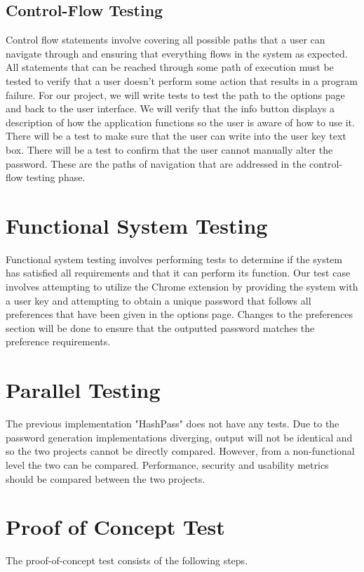 \documentclass[12pt]{article}
\begin{document}
\subsection{Control-Flow Testing}
Control flow statements involve covering all possible paths that a user can navigate through and ensuring that everything flows in the system as expected. All statements that can be reached through some path of execution must be tested to verify that a user doesn't perform some action that results in a program failure. For our project, we will write tests to test the path to the options page and back to the user interface. We will verify that the info button displays a description of how the application functions so the user is aware of how to use it. There will be a test to make sure that the user can write into the user key text box. There will be a test to confirm that the user cannot manually alter the password. These are the paths of navigation that are addressed in the control-flow testing phase.


\section{Functional System Testing}
Functional system testing involves performing tests to determine if the system has satisfied all requirements and that it can perform its function. Our test case involves attempting to utilize the Chrome extension by providing the system with a user key and attempting to obtain a unique password that follows all preferences that have been given in the options page. Changes to the preferences section will be done to ensure that the outputted password matches the preference requirements.

\section{Parallel Testing}
The previous implementation "HashPass" does not have any tests. Due to the password generation implementations diverging, output will not be identical and so the two projects cannot be directly compared. However, from a non-functional level the two can be compared. Performance, security and usability metrics should be compared between the two projects.

\section{Proof of Concept Test}
The proof-of-concept test consists of the following steps.
\newline
\end{document}
